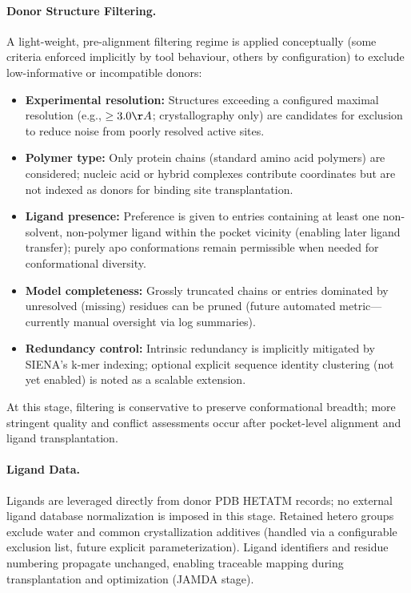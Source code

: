 \paragraph{Donor Structure Filtering.} A light-weight, pre-alignment filtering regime is applied conceptually (some criteria enforced implicitly by tool behaviour, others by configuration) to exclude low-informative or incompatible donors:
\begin{itemize}
    \item \textbf{Experimental resolution:} Structures exceeding a configured maximal resolution (e.g., \(\ge 3.0 \AA\); crystallography only) are candidates for exclusion to reduce noise from poorly resolved active sites.
    \item \textbf{Polymer type:} Only protein chains (standard amino acid polymers) are considered; nucleic acid or hybrid complexes contribute coordinates but are not indexed as donors for binding site transplantation.
    \item \textbf{Ligand presence:} Preference is given to entries containing at least one non-solvent, non-polymer ligand within the pocket vicinity (enabling later ligand transfer); purely apo conformations remain permissible when needed for conformational diversity.
    \item \textbf{Model completeness:} Grossly truncated chains or entries dominated by unresolved (missing) residues can be pruned (future automated metric—currently manual oversight via log summaries).
    \item \textbf{Redundancy control:} Intrinsic redundancy is implicitly mitigated by SIENA's k-mer indexing; optional explicit sequence identity clustering (not yet enabled) is noted as a scalable extension.
\end{itemize}
At this stage, filtering is conservative to preserve conformational breadth; more stringent quality and conflict assessments occur after pocket-level alignment and ligand transplantation.

\paragraph{Ligand Data.} Ligands are leveraged directly from donor PDB HETATM records; no external ligand database normalization is imposed in this stage. Retained hetero groups exclude water and common crystallization additives (handled via a configurable exclusion list, future explicit parameterization). Ligand identifiers and residue numbering propagate unchanged, enabling traceable mapping during transplantation and optimization (JAMDA stage).


